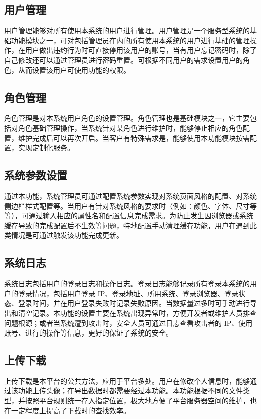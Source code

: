 \documentclass{izdthesis}
\begin{document}
\subsection{用户管理}
用户管理能够对所有使用本系统的用户进行管理。用户管理是一个服务型系统的基础功能模块之一，可对包括管理员在内的所有使用本系统的用户进行基础的管理操作，在用户做出违约行为时可直接停用该用户的账号，当有用户忘记密码时，除了自己修改还可以通过管理员进行密码重置。可根据不同用户的需求设置用户的角色，从而设置该用户可使用功能的权限。

\subsection{角色管理}
角色管理是对本系统用户角色的设置管理。角色管理也是基础模块之一，它主要包括对角色基础管理操作，当系统针对某角色进行维护时，能够停止相应的角色配置，维护完成后可以再次开启。当客户有特殊需求是，能够使用本功能模块按需配置，实现定制化服务。

\subsection{系统参数设置}
通过本功能，系统管理员可通过配置系统参数实现对系统页面风格的配置、对系统侧边栏样式配置等。当用户有针对系统风格的要求时（例如：颜色、字体、尺寸等等），可通过输入相应的属性名和配置信息完成需求。为防止发生因浏览器或系统缓存导致的完成配置后不生效等问题，特地配置手动清理缓存功能，用户在遇到此类情况是可通过触发该功能完成更新。

\subsection{系统日志}
系统日志包括用户的登录日志和操作日志。登录日志能够记录所有登录本系统的用户的登录情况，包括用户登录 IP、登录地址、所用系统、登录浏览器、登录状态、登录时间，并在用户登录失败时记录失败原因。当数据量过多时可手动进行导出和清空记录。本功能的设置主要在系统出现异常时，方便开发者或维护人员排查问题根源；或者当系统遭到攻击时，安全人员可通过日志查看攻击者的 IP、使用账号、进行的操作等信息，更好的保证了系统的安全。

\subsection{上传下载}
上传下载是本平台的公共方法，应用于平台多处。用户在修改个人信息时，能够通过该功能上传头像；在导出数据时都需要经过本功能。本功能根据不同的文件类型，并按照平台规则统一存入指定位置，极大地方便了平台服务器空间的维护，也在一定程度上提高了下载时的查找效率。
\end{document}
